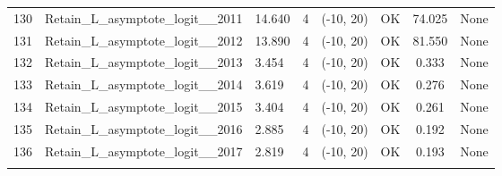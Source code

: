 \documentclass[12pt,]{article}
\begin{document}
\begin{landscape}
\begin{longtable}{lp{2.5in}lrcccl}
  130 & Retain\_L\_asymptote\_logit\_\_2011 & 14.640 & 4 & (-10, 20) & OK & 74.025 & None \\ 
  131 & Retain\_L\_asymptote\_logit\_\_2012 & 13.890 & 4 & (-10, 20) & OK & 81.550 & None \\ 
  132 & Retain\_L\_asymptote\_logit\_\_2013 & 3.454 & 4 & (-10, 20) & OK & 0.333 & None \\ 
  133 & Retain\_L\_asymptote\_logit\_\_2014 & 3.619 & 4 & (-10, 20) & OK & 0.276 & None \\ 
  134 & Retain\_L\_asymptote\_logit\_\_2015 & 3.404 & 4 & (-10, 20) & OK & 0.261 & None \\ 
  135 & Retain\_L\_asymptote\_logit\_\_2016 & 2.885 & 4 & (-10, 20) & OK & 0.192 & None \\ 
  136 & Retain\_L\_asymptote\_logit\_\_2017 & 2.819 & 4 & (-10, 20) & OK & 0.193 & None \\ 
   \hline
\hline
\label{tab:model_params}
\end{longtable}
\end{landscape}

\FloatBarrier
\end{document}
